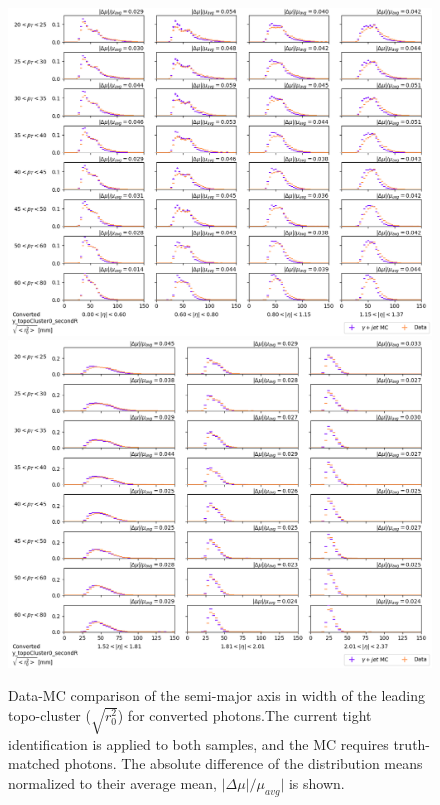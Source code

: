 \begin{figure}[!thp]
    \centering
    \includegraphics[width=.74\textwidth]{appendices/datamc_images/y_topoCluster0_secondR_Converted_lowerEta.png}
    \includegraphics[width=.74\textwidth]{appendices/datamc_images/y_topoCluster0_secondR_Converted_upperEta.png}
    \caption[Data-MC comparison of the semi-major axis in width of the leading topo-cluster ($\sqrt{r_0^2}$) for converted photons]{Data-MC comparison of the semi-major axis in width of the leading topo-cluster ($\sqrt{r_0^2}$) for converted photons.The current tight identification is applied to both samples, and the \gls{MC} requires truth-matched photons. The absolute difference of the distribution means normalized to their average mean, $|\Delta \mu|/\mu_{avg}|$ is shown.}
    \label{fig:dmc-c-sr}
\end{figure}
